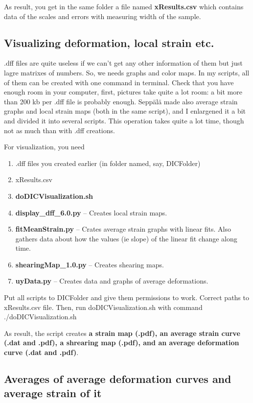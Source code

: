 \documentclass[a4paper]{article}
\begin{document}
As result, you get in the same folder a file named \textbf{xResults.csv} which 
contains data of the scales and errors with measuring width of the sample.

\subsection{Visualizing deformation, local strain etc.}

.dff files are quite useless if we can't get any other information of them but 
just lagre matrixes of numbers. So, we needs graphs and color maps. In my 
scripts, all of them can be created with one command in terminal. Check that you 
have enough room in your computer, first, pictures take quite a lot room: a bit 
more than 200 kb per .dff file is probably enough. Sepp\"{a}l\"{a} made also 
average strain graphs and local strain maps (both in the same script), and I 
enlargened it a bit and divided it into several scripts. This operation takes 
quite a lot time, though not as much than with .dff creations.

For visualization, you need

\begin{enumerate}
\item .dff files you created earlier (in folder named, say, DICFolder)
\item xResults.csv
\item \textbf{doDICVisualization.sh}
\item \textbf{display\_dff\_6.0.py} -- Creates local strain maps.
\item \textbf{fitMeanStrain.py} -- Crates average strain graphs with linear 
fits. Also gathers data about how the values (ie slope) of the linear fit 
change along time.
\item \textbf{shearingMap\_1.0.py} -- Creates shearing maps.
\item \textbf{uyData.py} -- Creates data and graphs of average deformations.
\end{enumerate}

Put all scripts to DICFolder and give them permissions to work. Correct paths 
to xResults.csv file. Then, run doDICVisualization.sh with command 
\textsf{./doDICVisualization.sh}

As result, the script creates \textbf{a strain map (.pdf), an average strain 
curve (.dat and .pdf), a shrearing map (.pdf), and an average deformation 
curve (.dat and .pdf)}.

\subsection{Averages of average deformation curves and average strain of it}
\end{document}
